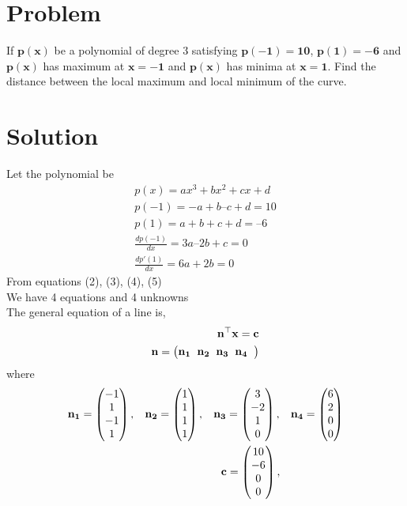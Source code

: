 \documentclass[10pt, a4paper]{article}
\title{\mytitle}
\author{\myauthor\hspace{1em}\\\contact\\FWC22098\hspace{6.5em}IITH\hspace{0.5em}\mymodule\hspace{6em}Assignment-optimization}
\newcommand{\myvec}[1]{\ensuremath{\begin{pmatrix}#1\end{pmatrix}}}
\let\vec\mathbf
\begin{document}
	\maketitle
	\tableofcontents
   \section{Problem}
If $\vec{p(x)}$ be a polynomial of degree 3 satisfying $\vec{p(\vec{-1})} = \vec{10}$, $\vec{p(1)} = \vec{-6}$ and $\vec{p(x)}$ has maximum at $\vec{x} = \vec{-1}$ and $\vec{p(x)}$ has minima at $\vec{x} = \vec{1}$. Find the distance between the local maximum and local minimum of the curve.
  \section{Solution}
Let the polynomial be\\
\begin{align}
p(x)=ax^3 + bx^2 + cx + d\\
p(-1) = -a + b – c + d = 10\\
p(1) = a + b + c + d = –6\\
 \frac{dp(-1)}{dx}= 3a – 2b + c = 0\\
\frac{dp'(1)}{dx}= 6a + 2b = 0
\end{align}
From equations (2), (3), (4), (5)\\
We have 4 equations and 4 unknowns\\
The general equation of a line is,\\
\begin{align}
\vec{n}^\top \vec{x} = \vec{c}\\
\vec{n} = \myvec{\vec{n_1}\hspace{2mm}\vec{n_2}\hspace{2mm}\vec{n_3}\hspace{2mm}\vec{n_4}\hspace{2mm}}
\end{align} 
where
\begin{align}
\vec{n_1}=\myvec{-1\\1\\-1\\1},\hspace{3mm} \vec{n_2}=\myvec{1\\1\\1\\1}, \hspace{3mm} \vec{n_3}=\myvec{3\\-2\\1\\0}, \hspace{3mm} \vec{n_4}=\myvec{6\\2\\0\\0}\\ 
\vec{c}=\myvec{10\\-6\\0\\0},\hspace{20mm}
\end{align} 
\end{document}
